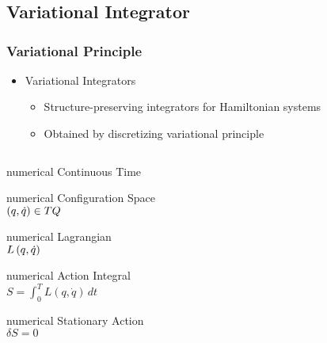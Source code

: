 \section*{}
\subsection*{Variational Integrator}
\begin{frame} %
\frametitle{Variational Principle}
	\begin{itemize}
		\item Variational Integrators
			\begin{itemize}
				\item Structure-preserving integrators for Hamiltonian systems
				\item Obtained by discretizing variational principle
			\end{itemize}
	\end{itemize}
	\pause
	\begin{columns}[c]
		\begin{column}{0.5\textwidth}
			\centering
			\begin{beamercolorbox}[wd=0.8\columnwidth,sep=0.05cm,center]{numerical} Continuous Time \end{beamercolorbox}
			\begin{beamercolorbox}[wd=0.8\columnwidth,sep=0.05cm,center]{numerical} 
				Configuration Space \\
				\( \left( q, \dot{q}  \right) \in TQ \)
			\end{beamercolorbox}
			\begin{beamercolorbox}[wd=0.8\columnwidth,sep=0.05cm,center]{numerical} 
				Lagrangian \\
				\( L\left( q, \dot{q}  \right) \)
			\end{beamercolorbox}
			\begin{beamercolorbox}[wd=0.8\columnwidth,sep=0.05cm,center]{numerical} 
				Action Integral \\
				\( S = \int_{0}^T L\left( q, \dot{q}\right) \, dt \)
			\end{beamercolorbox}
			\begin{beamercolorbox}[wd=0.8\columnwidth,sep=0.05cm,center]{numerical} 
				Stationary Action \\
				\( \delta S = 0 \)
			\end{beamercolorbox}

\end{column}
\end{columns}
\end{frame}
